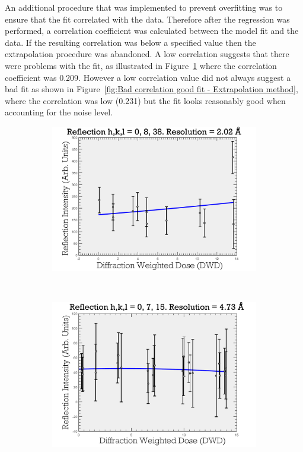 An additional procedure that was implemented to prevent overfitting was to ensure that the fit correlated with the data.
Therefore after the regression was performed, a correlation coefficient was calculated between the model fit and the data.
If the resulting correlation was below a specified value then the extrapolation procedure was abandoned.
A low correlation suggests that there were problems with the fit, as illustrated in Figure~\ref{fig:Bad correlation bad fit - Extrapolation method} where the correlation coefficient was 0.209.
However a low correlation value did not always suggest a bad fit as shown in Figure~\ref{fig:Bad correlation good fit - Extrapolation method}, where the correlation was low (0.231) but the fit looks reasonably good when accounting for the noise level.
\begin{figure}
        \centering
        \begin{subfigure}[b]{1\textwidth}
                \centering
                \includegraphics[width=\textwidth]{figures/zde/ReflectionPlot_h,k,l_0,8,38-bad_corr_bad_fit.pdf}
                \caption{}
                \label{fig:Bad correlation bad fit - Extrapolation method}
        \end{subfigure}
				\\
        \begin{subfigure}[b]{1\textwidth}
                \centering
                \includegraphics[width=\textwidth]{figures/zde/ReflectionPlot_h,k,l_0,7,15-bad_corr_good_fit.pdf}

\end{subfigure}
\end{figure}
